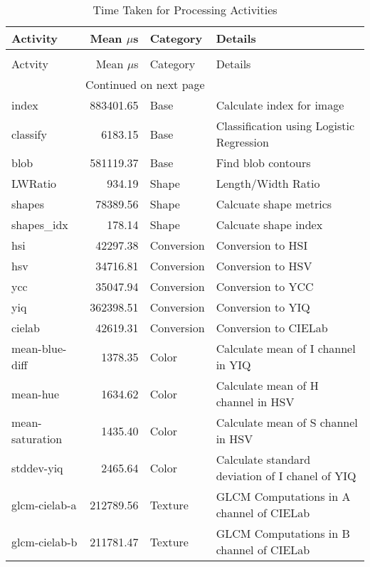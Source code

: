 \begin{longtable}{lrll}
\caption[Time Taken for Processing Activities]{Time Taken for Processing Activites}
\label{table:performance}\\
\toprule
Activity & Mean $\mu$s   & Category & Details                   \\
\midrule
\endfirsthead
\caption[]{Time Taken for Processing Activities} \\
\toprule
Actvity & Mean $\mu$s   & Category & Details                    \\
\midrule
\endhead
\midrule
\multicolumn{3}{r}{{Continued on next page}} \\
\midrule
\endfoot

\bottomrule
\endlastfoot
index           &  883401.65 & Base & Calculate index for image\\
classify        &    6183.15 & Base & Classification using Logistic Regression\\
blob        &  581119.37 & Base & Find blob contours\\
\midrule
LWRatio         &     934.19 & Shape& Length/Width Ratio\\
shapes      &     78389.56 & Shape&  Calcuate shape metrics\\
shapes\_idx      &     178.14 & Shape& Calcuate shape index\\
\midrule
hsi             &   42297.38 & Conversion& Conversion to HSI\\
hsv             &   34716.81 & Conversion&Conversion to HSV\\
ycc             &   35047.94 & Conversion& Conversion to YCC\\
yiq             &  362398.51 & Conversion& Conversion to YIQ\\
cielab          &   42619.31 & Conversion& Conversion to CIELab\\
\midrule
mean-blue-diff  &    1378.35 & Color & Calculate mean of I channel in YIQ\\
mean-hue        &    1634.62 & Color & Calculate mean of H channel in HSV\\
mean-saturation &    1435.40 & Color & Calculate mean of S channel in HSV\\
stddev-yiq      &    2465.64 & Color & Calculate standard deviation of I chanel of YIQ\\
\midrule
glcm-cielab-a   &  212789.56 & Texture & GLCM Computations in A channel of CIELab\\
glcm-cielab-b   &  211781.47 & Texture &  GLCM Computations in B channel of CIELab\\

\end{longtable}
